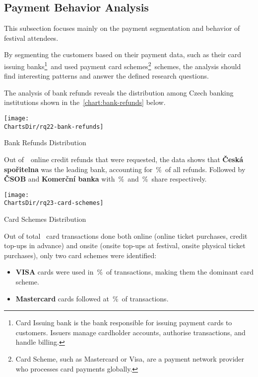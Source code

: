 
\subsection{Payment Behavior Analysis}
\label{subsec:analysis-customer-payment-behavior}
This subsection focuses mainly on the payment segmentation and behavior of festival attendees.

By segmenting the customers based on their payment data,
such as their card issuing banks\footnote{Card Issuing bank is the bank responsible for issuing payment cards to customers. Issuers manage cardholder accounts, authorise transactions, and handle billing\cite{jc_what_are_card_schemes_and_how_do_they_work}.}~and
used payment card schemes\footnote{Card Scheme, such as Mastercard or Visa, are a payment network provider who processes card payments globally\cite{jc_what_are_card_schemes_and_how_do_they_work}.}~schemes,
the analysis should find interesting patterns and answer the defined research questions.


The analysis of bank refunds reveals the distribution among Czech banking institutions shown in the~\autoref{chart:bank-refunds} below.

\begin{chart}[H]
	\centering
	\texttt{[image: \\ChartsDir/rq22-bank-refunds]}
	\caption{ Bank Refunds Distribution}
	\label{chart:bank-refunds}
	\source
\end{chart}

Out of~~online credit refunds that were requested, the data shows that \textbf{Česká spořitelna} was the leading bank, accounting for~\%~of all refunds.
Followed by \textbf{ČSOB} and \textbf{Komerční banka} with~\%~and~\%~share respectively.


\begin{chart}[H]
	\centering
	\texttt{[image: \\ChartsDir/rq23-card-schemes]}
	\caption{ Card Schemes Distribution}
	\label{chart:card-schemes}
	\source
\end{chart}

Out of total ~card transactions done both online (online ticket purchases, credit top-ups in advance) and onsite (onsite top-ups at festival, onsite physical ticket purchases), only two card schemes were identified:
\begin{itemize}
	\item \textbf{VISA} cards were used in~\%~of transactions, making them the dominant card scheme.
	\item \textbf{Mastercard} cards followed at~\%~of transactions.
\end{itemize}

